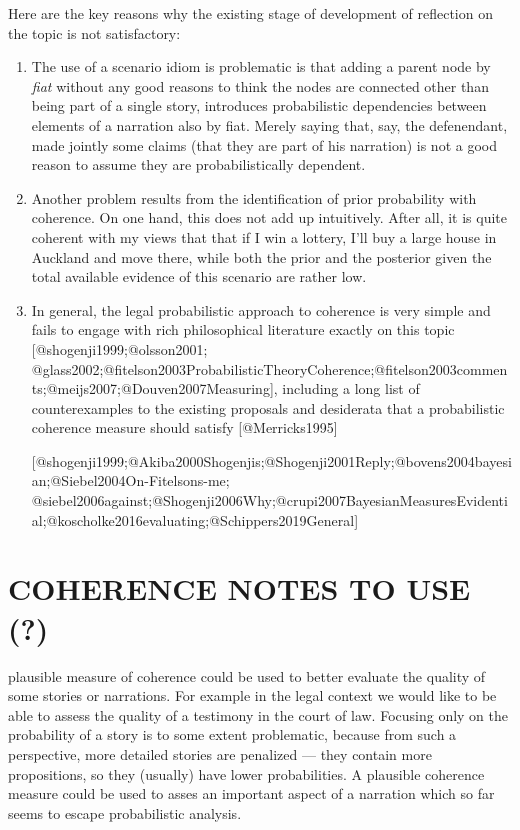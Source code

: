 \documentclass[11pt,dvipsnames,enabledeprecatedfontcommands]{scrartcl}
\begin{document}
Here are the key reasons why the existing stage of development of
reflection on the topic is not satisfactory:

\begin{enumerate}
\item The use of a scenario idiom is problematic is that adding a parent node by \emph{fiat} without any good reasons to think the nodes are connected other than being part of a single story, introduces probabilistic dependencies between elements of a narration also by fiat. Merely saying that, say, the defenendant, made jointly some claims (that they are part of his narration) is not a good reason to assume they are probabilistically dependent.



\item Another problem results from the identification of prior probability with coherence. On one hand, this does not add up intuitively. After all, it is quite coherent with my views that that if I win a lottery, I'll buy a large house in Auckland and move there, while both the prior and the posterior given the total available evidence  of this scenario are rather low. 

\item In general, the legal probabilistic approach to coherence is very simple and fails to engage with rich philosophical literature exactly on this topic [@shogenji1999;@olsson2001; @glass2002;@fitelson2003ProbabilisticTheoryCoherence;@fitelson2003comments;@meijs2007;@Douven2007Measuring], including a long list of counterexamples to the existing proposals and desiderata that a probabilistic coherence measure should satisfy [@Merricks1995]

[@shogenji1999;@Akiba2000Shogenjis;@Shogenji2001Reply;@bovens2004bayesian;@Siebel2004On-Fitelsons-me; @siebel2006against;@Shogenji2006Why;@crupi2007BayesianMeasuresEvidential;@koscholke2016evaluating;@Schippers2019General]

  





\end{enumerate}

\hypertarget{coherence-notes-to-use}{%
\section{COHERENCE NOTES TO USE (?)}\label{coherence-notes-to-use}}

plausible measure of coherence could be used to better evaluate the
quality of some stories or narrations. For example in the legal context
we would like to be able to assess the quality of a testimony in the
court of law. Focusing only on the probability of a story is to some
extent problematic, because from such a perspective, more detailed
stories are penalized --- they contain more propositions, so they
(usually) have lower probabilities. A plausible coherence measure could
be used to asses an important aspect of a narration which so far seems
to escape probabilistic analysis.
\end{document}

